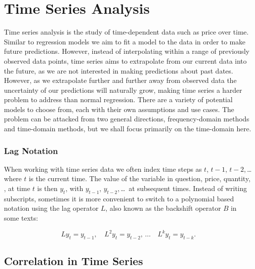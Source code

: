 \section{Time Series Analysis}
\label{additional:time_series}

Time series analysis is the study of time-dependent data such as price over time.
Similar to regression models we aim to fit a model
to the data in order to make future predictions.
However, instead of interpolating within a range of previously observed data points,
time series aims to extrapolate from our current data into the future,
as we are not interested in making predictions about past dates.
However, as we extrapolate further and further away from observed data
the uncertainty of our predictions will naturally grow,
making time series a harder problem to address than normal regression.
There are a variety of potential models to choose from,
each with their own assumptions and use cases.
The problem can be attacked from two general directions,
frequency-domain methods and time-domain methods,
but we shall focus primarily on the time-domain here.

\subsubsection{Lag Notation}
\label{additional:time_series:L}

When working with time series data we often index time steps as $t$, $t-1$, $t-2$,\,\ldots\,
where $t$ is the current time.
The value of the variable in question, price, quantity, \etc,
at time $t$ is then $y_{t}$, with $y_{t-1}$, $y_{t-2}$,\,\ldots\, at subsequent times.
Instead of writing subscripts, sometimes it is more convenient
to switch to a polynomial based notation using
the lag operator $L$, also known as the backshift operator $B$ in some texts:

\begin{equation}\label{eq:time_series:L}
L y_{t} = y_{t-1},\quad L^{2} y_{t} = y_{t-2},\,\ldots \quad L^{k} y_{t} = y_{t-k}.
\end{equation}

\subsection{Correlation in Time Series}
\label{additional:time_series:correlation}

